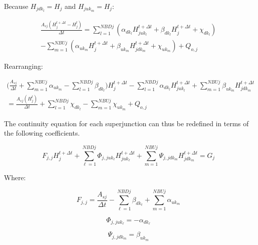 \documentclass[11pt]{article}
\begin{document}
Because $H_{jdk_l} = H_j$ and $H_{juk_m} = H_j$:

\begin{equation}
  \begin{split}
    \frac{A_{sj} (H_j^{t + \Delta t} - H_j^t)}{\Delta t} =
    \sum_{l=1}^{NBDj} (\alpha_{dk_l} H_{juk_l}^{t + \Delta t} + \beta_{dk_l}
    H_{j}^{t + \Delta t} + \chi_{dk_l})\\
    - \sum_{m=1}^{NBUj} (\alpha_{uk_m}
    H_{j}^{t + \Delta t} + \beta_{uk_m} H_{jdk_m}^{t + \Delta t} + \chi_{uk_m}) +
    Q_{o,j}
  \end{split}
\end{equation}

Rearranging:

\begin{equation}
  \begin{split}
    \biggl( \frac{A_{sj}}{\Delta t} + \sum_{m=1}^{NBUj} \alpha_{uk_m} - \sum_{l=1}^{NBDj} \beta_{dk_l} \biggr) H_j^{t + \Delta t} 
    - \sum_{l=1}^{NBDj} \alpha_{dk_l} H_{juk_l}^{t + \Delta t} + \sum_{m=1}^{NBUj} \beta_{uk_m} H_{jdk_m}^{t + \Delta t} \\
    =
    \frac{A_{sj} (H_j^t)}{\Delta t} + \sum_{l=1}^{NBDj} \chi_{dk_l} - \sum_{m=1}^{NBUj} \chi_{uk_m} + Q_{o,j}
  \end{split}
\end{equation}

The continuity equation for each superjunction can thus be redefined in terms of
the following coefficients.

\begin{equation}
 \boxed{
 F_{j,j} H_{j}^{t + \Delta t} + \sum_{\ell=1}^{NBDj} \Phi_{j,juk_\ell} H_{juk_\ell}^{t + \Delta t} + \sum_{m=1}^{NBUj} \Psi_{j,jdk_m} H_{jdk_m}^{t + \Delta t} = G_j
 }
\end{equation}

Where:

\begin{equation}
  \boxed{
  F_{j,j} = \frac{A_{sj}}{\Delta t} - \sum_{\ell=1}^{NBDj} \beta_{dk_\ell} + \sum_{m=1}^{NBUj} \alpha_{uk_m}
  }
\end{equation}

\begin{equation}
  \boxed{
  \Phi_{j,juk_\ell} = - \alpha_{dk_\ell}
  }
\end{equation}

\begin{equation}
  \boxed{
  \Psi_{j,jdk_m} = \beta_{uk_m}
  }
\end{equation}
\end{document}
